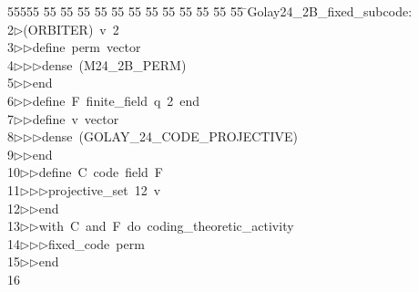 %
%
\begin{tabbing}
55555 \= 55 \= 55 \= 55 \= 55 \= 55 \= 55 \= 55 \= 55 \= 55 \= 55 \= 55 \= 55 \= \>Golay24\_2B\_fixed\_subcode:\\[0pt]
2\>$\triangleright$\>(ORBITER)\ v\ 2\ \\[0pt]
3\>$\triangleright$\>$\triangleright$\>define\ perm\ vector\ \\[0pt]
4\>$\triangleright$\>$\triangleright$\>$\triangleright$\>dense\ (M24\_2B\_PERM)\ \\[0pt]
5\>$\triangleright$\>$\triangleright$\>end\ \\[0pt]
6\>$\triangleright$\>$\triangleright$\>define\ F\ finite\_field\ q\ 2\ end\ \\[0pt]
7\>$\triangleright$\>$\triangleright$\>define\ v\ vector\ \\[0pt]
8\>$\triangleright$\>$\triangleright$\>$\triangleright$\>dense\ (GOLAY\_24\_CODE\_PROJECTIVE)\ \\[0pt]
9\>$\triangleright$\>$\triangleright$\>end\ \\[0pt]
10\>$\triangleright$\>$\triangleright$\>define\ C\ code\ field\ F\ \\[0pt]
11\>$\triangleright$\>$\triangleright$\>$\triangleright$\>projective\_set\ 12\ v\ \\[0pt]
12\>$\triangleright$\>$\triangleright$\>end\ \\[0pt]
13\>$\triangleright$\>$\triangleright$\>with\ C\ and\ F\ do\ coding\_theoretic\_activity\ \\[0pt]
14\>$\triangleright$\>$\triangleright$\>$\triangleright$\>fixed\_code\ perm\ \\[0pt]
15\>$\triangleright$\>$\triangleright$\>end\ \\[0pt]
16\>\end{tabbing}
